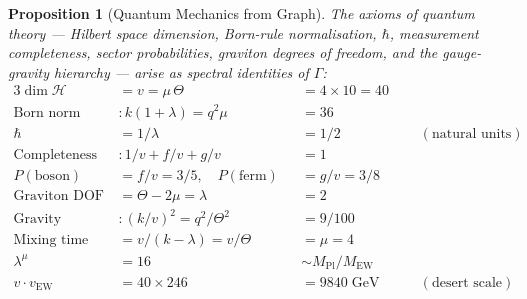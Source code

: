 \documentclass[12pt,a4paper]{article}
\newtheorem{proposition}[theorem]{Proposition}
\begin{document}
\begin{proposition}[Quantum Mechanics from Graph]\label{prop:qm-from-graph}
The axioms of quantum theory --- Hilbert space dimension, Born-rule
normalisation, $\hbar$, measurement completeness, sector probabilities,
graviton degrees of freedom, and the gauge-gravity hierarchy ---
arise as spectral identities of $\Gamma$:
\begin{alignat*}{3}
  \dim\mathcal{H} &= v = \mu\,\Theta &&= 4 \times 10 = 40
    &\;& \\
  \text{Born norm} &\colon k(1{+}\lambda) = q^2\mu &&= 36 && \\
  \hbar &= 1/\lambda &&= 1/2 && (\text{natural units}) \\
  \text{Completeness}&\colon 1/v + f/v + g/v &&= 1 && \\
  P(\text{boson}) &= f/v = 3/5, \quad P(\text{ferm}) &&= g/v = 3/8 && \\
  \text{Graviton DOF} &= \Theta - 2\mu = \lambda &&= 2 && \\
  \text{Gravity coupling}&\colon (k/v)^2 = q^2/\Theta^2 &&= 9/100 && \\
  \text{Mixing time} &= v/(k{-}\lambda) = v/\Theta &&= \mu = 4 && \\
  \lambda^\mu &= 16 &&\sim M_{\mathrm{Pl}}/M_{\mathrm{EW}} && \\
  v \cdot v_{\mathrm{EW}} &= 40 \times 246 &&= 9840\;\mathrm{GeV}
    \quad && (\text{desert scale})
\end{alignat*}
\end{proposition}
\end{document}
